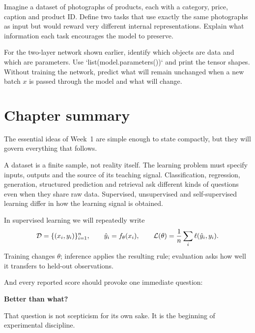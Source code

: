 \begin{optionalexercise}[title={3. Same data, different objective}]
Imagine a dataset of photographs of products, each with a category, price, caption and product ID. Define two tasks that use exactly the same photographs as input but would reward very different internal representations. Explain what information each task encourages the model to preserve.
\end{optionalexercise}

\begin{optionalexercise}[title={4. PyTorch reading exercise}]
For the two-layer network shown earlier, identify which objects are data and which are parameters. Use `list(model.parameters())` and print the tensor shapes. Without training the network, predict what will remain unchanged when a new batch \(x\) is passed through the model and what will change.
\end{optionalexercise}

\section{Chapter summary}

The essential ideas of Week~1 are simple enough to state compactly, but they will govern everything that follows.

A dataset is a finite sample, not reality itself. The learning problem must specify inputs, outputs and the source of its teaching signal. Classification, regression, generation, structured prediction and retrieval ask different kinds of questions even when they share raw data. Supervised, unsupervised and self-supervised learning differ in how the learning signal is obtained.

In supervised learning we will repeatedly write
\[
  \mathcal{D}=\{(x_i,y_i)\}_{i=1}^{n},
  \qquad
  \hat y_i=f_\theta(x_i),
  \qquad
  \mathcal{L}(\theta)=\frac{1}{n}\sum_i
  \ell(\hat y_i,y_i).
\]
Training changes \(\theta\); inference applies the resulting rule; evaluation asks how well it transfers to held-out observations.

And every reported score should provoke one immediate question:

\begin{center}
  \Large\bfseries Better than what?
\end{center}

That question is not scepticism for its own sake. It is the beginning of experimental discipline.
